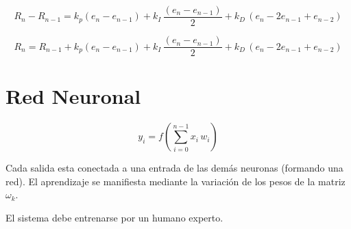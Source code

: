$$
R_n - R_{n-1}= k_p(e_n - e_{n-1}) + k_I \, \dfrac{(e_n - e_{n-1})}{2}+ k_D \, (e_n - 2e_{n-1}+ e_{n-2})
$$

$$
R_n = R_{n-1}+k_p(e_n - e_{n-1}) + k_I \, \dfrac{(e_n - e_{n-1})}{2}+ k_D \, (e_n - 2e_{n-1}+ e_{n-2})
$$


\section{Red Neuronal}


$$
y_i = f\left(\sum_{i=0}^{n-1} x_i \, w_i \right)
$$



Cada salida esta conectada a una entrada de las demás neuronas (formando una red). El aprendizaje se manifiesta mediante la variación de los pesos de la matriz $\omega_k$.

El sistema debe entrenarse por un humano experto. 



